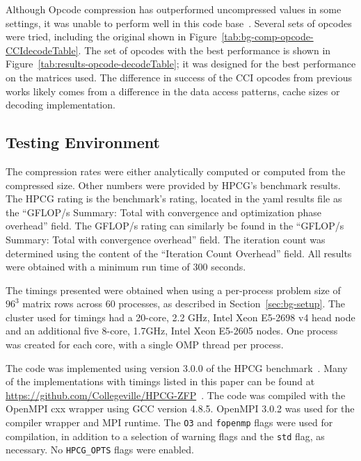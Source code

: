 Although Opcode compression has outperformed uncompressed values in some settings, it was unable to perform well in this code base~\cite{Lawlor:2013:compression}.
Several sets of opcodes were tried, including the original shown in Figure~\ref{tab:bg-comp-opcode-CCIdecodeTable}.
The set of opcodes with the best performance is shown in Figure~\ref{tab:results-opcode-decodeTable}; it was designed for the best performance on the matrices used.
The difference in success of the CCI opcodes from previous works likely comes from a difference in the data access patterns, cache sizes or decoding implementation.

\subsection{Testing Environment}
The compression rates were either analytically computed or computed from the compressed size.
Other numbers were provided by HPCG's benchmark results.
The HPCG rating is the benchmark's rating, located in the yaml results file as the ``GFLOP/s Summary: Total with convergence and optimization phase overhead'' field.
The GFLOP/s rating can similarly be found in the ``GFLOP/s Summary: Total with convergence overhead'' field.
The iteration count was determined using the content of the ``Iteration Count Overhead'' field.
All results were obtained with a minimum run time of 300 seconds.

The timings presented were obtained when using a per-process problem size of \(96^3\) matrix rows across 60 processes, as described in Section~\ref{sec:bg-setup}.
The cluster used for timings had a 20-core, 2.2 GHz, Intel Xeon E5-2698 v4 head node and an additional five 8-core, 1.7GHz, Intel Xeon E5-2605 nodes.
One process was created for each core, with a single OMP thread per process.

The code was implemented using version 3.0.0 of the HPCG benchmark~\cite{Dongarra:2015:HPCG}.
Many of the implementations with timings listed in this paper can be found at \url{https://github.com/Collegeville/HPCG-ZFP}~\cite{Lindquist:2018:projectGithub}.
The code was compiled with the OpenMPI cxx wrapper using GCC version 4.8.5.
OpenMPI 3.0.2 was used for the compiler wrapper and MPI runtime.
The \texttt{O3} and \texttt{fopenmp} flags were used for compilation, in addition to a selection of warning flags and the \texttt{std} flag, as necessary.
No \texttt{HPCG\_OPTS} flags were enabled.
